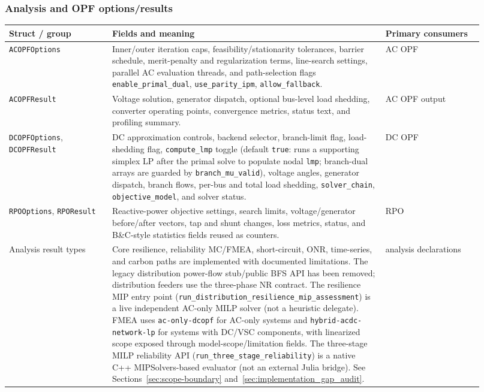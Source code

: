 \subsubsection*{Analysis and OPF options/results}
\begin{longtable}{L{0.20\linewidth}L{0.53\linewidth}L{0.19\linewidth}}
\toprule
Struct / group & Fields and meaning & Primary consumers \\
\midrule
\endhead
\texttt{ACOPFOptions} & Inner/outer iteration caps, feasibility/stationarity tolerances, barrier schedule, merit-penalty and regularization terms, line-search settings, parallel AC evaluation threads, and path-selection flags \texttt{enable\_primal\_dual}, \texttt{use\_parity\_ipm}, \texttt{allow\_fallback}. & AC OPF \\
\texttt{ACOPFResult} & Voltage solution, generator dispatch, optional bus-level load shedding, converter operating points, convergence metrics, status text, and profiling summary. & AC OPF output \\
\texttt{DCOPFOptions}, \texttt{DCOPFResult} & DC approximation controls, backend selector, branch-limit flag, load-shedding flag, \texttt{compute\_lmp} toggle (default \texttt{true}: runs a supporting simplex LP after the primal solve to populate nodal \texttt{lmp}; branch-dual arrays are guarded by \texttt{branch\_mu\_valid}), voltage angles, generator dispatch, branch flows, per-bus and total load shedding, \texttt{solver\_chain}, \texttt{objective\_model}, and solver status. & DC OPF \\
\texttt{RPOOptions}, \texttt{RPOResult} & Reactive-power objective settings, search limits, voltage/generator before/after vectors, tap and shunt changes, loss metrics, status, and B\&C-style statistics fields reused as counters. & RPO \\
Analysis result types & Core resilience, reliability MC/FMEA, short-circuit, ONR, time-series, and carbon paths are implemented with documented limitations.  The legacy distribution power-flow stub/public BFS API has been removed; distribution feeders use the three-phase NR contract.  The resilience MIP entry point (\texttt{run\_distribution\_resilience\_mip\_assessment}) is a live independent AC-only MILP solver (not a heuristic delegate).  FMEA uses \texttt{ac-only-dcopf} for AC-only systems and \texttt{hybrid-acdc-network-lp} for systems with DC/VSC components, with linearized scope exposed through model-scope/limitation fields.  The three-stage MILP reliability API (\texttt{run\_three\_stage\_reliability}) is a native C++ MIPSolvers-based evaluator (not an external Julia bridge).  See Sections~\ref{sec:scope-boundary} and~\ref{sec:implementation_gap_audit}. & analysis declarations \\
\bottomrule
\end{longtable}


